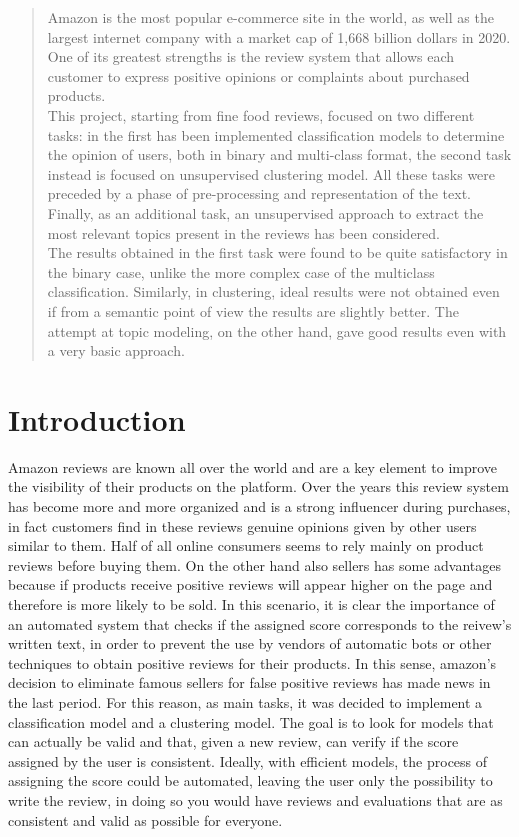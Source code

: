 \documentclass[11pt]{article}
\begin{document}
\thispagestyle{empty}
  \tableofcontents


\clearpage
\setcounter{page}{0}
\setcounter{page}{1}

\begin{abstract}
Amazon is the most popular e-commerce site in the world, as well as the largest internet company with a market cap of 1,668 billion dollars in 2020. One of its greatest strengths is the review system that allows each customer to express positive opinions or complaints about purchased products. \\
This project, starting from fine food reviews, focused on two different tasks: in the first has been implemented classification models to determine the opinion of users, both in binary and multi-class format, the second task instead is focused on unsupervised clustering model. All these tasks were preceded by a phase of pre-processing and representation of the text. Finally, as an additional task, an unsupervised approach to extract the most relevant topics present in the reviews has been considered.\\
The results obtained in the first task were found to be quite satisfactory in the binary case, unlike the more complex case of the multiclass classification. Similarly, in clustering, ideal results were not obtained even if from a semantic point of view the results are slightly better. The attempt at topic modeling, on the other hand, gave good results even with a very basic approach. 
\end{abstract}


\section{Introduction}
Amazon reviews are known all over the world and are a key element to improve the visibility of their products on the platform.
Over the years this review system has become more and more organized and is a strong influencer during purchases, in fact customers find in these reviews genuine opinions given by other users similar to them. Half of all online consumers seems to rely mainly on product reviews before buying them. On the other hand also sellers has some advantages because if products receive positive reviews will appear higher on the page and therefore is more likely to be sold. In this scenario, it is clear the importance of an automated system that checks if the assigned score corresponds to the reivew's written text, in order to prevent the use by vendors of automatic bots or other techniques to obtain positive reviews for their products. In this sense, amazon's decision to eliminate famous sellers for false positive reviews has made news in the last period.
For this reason, as main tasks, it was decided to implement a classification model and a clustering model. 
The goal is to look for models that can actually be valid and that, given a new review, can verify if the score assigned by the user is consistent. Ideally, with efficient models, the process of assigning the score could be automated, leaving the user only the possibility to write the review, in doing so you would have reviews and evaluations that are as consistent and valid as possible for everyone.
\end{document}
